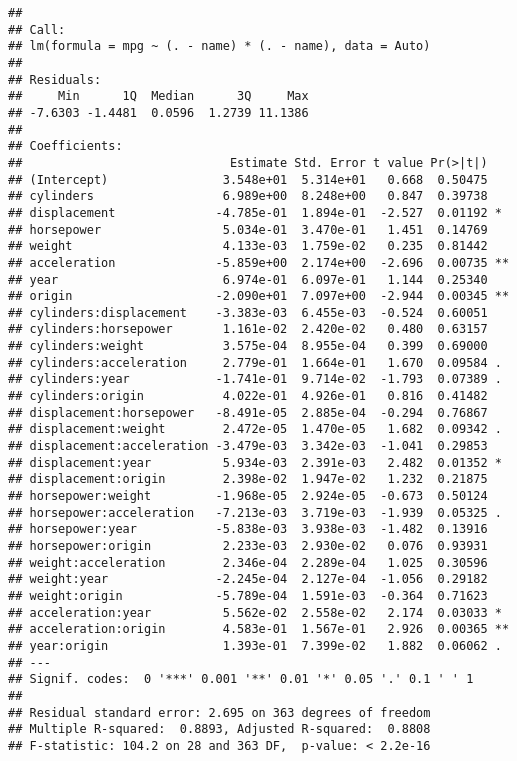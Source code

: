 \documentclass[]{article}
\begin{document}
\begin{verbatim}
## 
## Call:
## lm(formula = mpg ~ (. - name) * (. - name), data = Auto)
## 
## Residuals:
##     Min      1Q  Median      3Q     Max 
## -7.6303 -1.4481  0.0596  1.2739 11.1386 
## 
## Coefficients:
##                             Estimate Std. Error t value Pr(>|t|)   
## (Intercept)                3.548e+01  5.314e+01   0.668  0.50475   
## cylinders                  6.989e+00  8.248e+00   0.847  0.39738   
## displacement              -4.785e-01  1.894e-01  -2.527  0.01192 * 
## horsepower                 5.034e-01  3.470e-01   1.451  0.14769   
## weight                     4.133e-03  1.759e-02   0.235  0.81442   
## acceleration              -5.859e+00  2.174e+00  -2.696  0.00735 **
## year                       6.974e-01  6.097e-01   1.144  0.25340   
## origin                    -2.090e+01  7.097e+00  -2.944  0.00345 **
## cylinders:displacement    -3.383e-03  6.455e-03  -0.524  0.60051   
## cylinders:horsepower       1.161e-02  2.420e-02   0.480  0.63157   
## cylinders:weight           3.575e-04  8.955e-04   0.399  0.69000   
## cylinders:acceleration     2.779e-01  1.664e-01   1.670  0.09584 . 
## cylinders:year            -1.741e-01  9.714e-02  -1.793  0.07389 . 
## cylinders:origin           4.022e-01  4.926e-01   0.816  0.41482   
## displacement:horsepower   -8.491e-05  2.885e-04  -0.294  0.76867   
## displacement:weight        2.472e-05  1.470e-05   1.682  0.09342 . 
## displacement:acceleration -3.479e-03  3.342e-03  -1.041  0.29853   
## displacement:year          5.934e-03  2.391e-03   2.482  0.01352 * 
## displacement:origin        2.398e-02  1.947e-02   1.232  0.21875   
## horsepower:weight         -1.968e-05  2.924e-05  -0.673  0.50124   
## horsepower:acceleration   -7.213e-03  3.719e-03  -1.939  0.05325 . 
## horsepower:year           -5.838e-03  3.938e-03  -1.482  0.13916   
## horsepower:origin          2.233e-03  2.930e-02   0.076  0.93931   
## weight:acceleration        2.346e-04  2.289e-04   1.025  0.30596   
## weight:year               -2.245e-04  2.127e-04  -1.056  0.29182   
## weight:origin             -5.789e-04  1.591e-03  -0.364  0.71623   
## acceleration:year          5.562e-02  2.558e-02   2.174  0.03033 * 
## acceleration:origin        4.583e-01  1.567e-01   2.926  0.00365 **
## year:origin                1.393e-01  7.399e-02   1.882  0.06062 . 
## ---
## Signif. codes:  0 '***' 0.001 '**' 0.01 '*' 0.05 '.' 0.1 ' ' 1
## 
## Residual standard error: 2.695 on 363 degrees of freedom
## Multiple R-squared:  0.8893, Adjusted R-squared:  0.8808 
## F-statistic: 104.2 on 28 and 363 DF,  p-value: < 2.2e-16
\end{verbatim}
\end{document}
